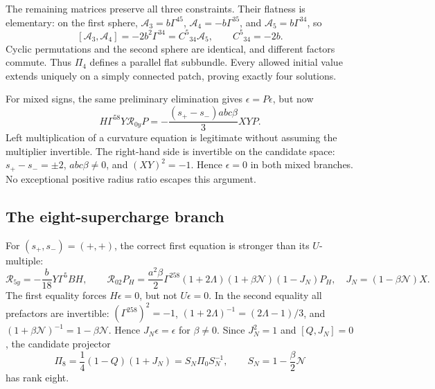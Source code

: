 The remaining matrices preserve all three constraints. Their flatness is elementary: on the first sphere,
$\mathcal A_3=b\Gamma^{45}$, $\mathcal A_4=-b\Gamma^{35}$, and $\mathcal A_5=b\Gamma^{34}$, so
\begin{equation}\label{null:four-flatness}
 [\mathcal A_3,\mathcal A_4]=-2b^2\Gamma^{34}
 =C^5{}_{34}\mathcal A_5,\qquad C^5{}_{34}=-2b.
\end{equation}
Cyclic permutations and the second sphere are identical, and different factors commute. Thus $\Pi_4$ defines a parallel flat subbundle. Every allowed initial value extends uniquely on a simply connected patch, proving exactly four solutions.

For mixed signs, the same preliminary elimination gives $\epsilon=P\epsilon$, but now
\begin{equation}\label{null:mixed-obstruction}
 H\Gamma^{58}Y\mathcal R_{0y}P
 =-\frac{(s_+-s_-)abc\beta}{3}XY P.
\end{equation}
Left multiplication of a curvature equation is legitimate without assuming the multiplier invertible. The right-hand side is invertible on the candidate space: $s_+-s_-=\pm2$, $abc\beta\ne0$, and $(XY)^2=-1$. Hence $\epsilon=0$ in both mixed branches. No exceptional positive radius ratio escapes this argument.

\subsection{The eight-supercharge branch}

For $(s_+,s_-)=(+,+)$, the correct first equation is stronger than its $U$-multiple:
\begin{equation}\label{null:eight-upper}
 \mathcal R_{5y}=-\frac b{18}Y\Gamma^5BH,\qquad
 \mathcal R_{02}P_H=\frac{a^2\beta}{2}\Gamma^{258}(1+2\Lambda)
 (1+\beta\mathcal N)(1-J_N)P_H,
 \quad J_N=(1-\beta\mathcal N)X.
\end{equation}
The first equality forces $H\epsilon=0$, but not $U\epsilon=0$. In the second equality all prefactors are invertible:
$(\Gamma^{258})^2=-1$, $(1+2\Lambda)^{-1}=(2\Lambda-1)/3$, and
$(1+\beta\mathcal N)^{-1}=1-\beta\mathcal N$. Hence $J_N\epsilon=\epsilon$ for $\beta\ne0$. Since $J_N^2=1$ and $[Q,J_N]=0$, the candidate projector
\begin{equation}\label{null:eight-projector}
 \Pi_8=\frac14(1-Q)(1+J_N)
 =S_N\Pi_0S_N^{-1},\qquad
 S_N=1-\frac\beta2\mathcal N
\end{equation}
has rank eight.


